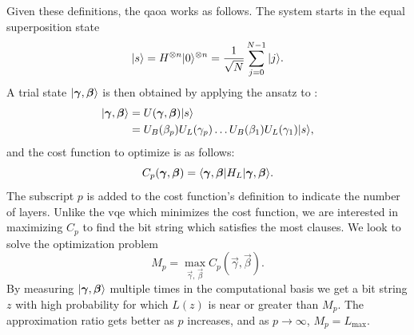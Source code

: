 Given these definitions, the \gls{qaoa} works as follows.
The system starts in the equal superposition state
\begin{equation}
\vert{s}\rangle = H^{\otimes n}\vert{0}\rangle^{\otimes n} = \frac{1}{\sqrt{N}} \sum_{j=0}^{N-1} \vert{j}\rangle.
\end{equation}
A trial state $\vert{\bm{\gamma}, \bm{\beta}}\rangle$ is then obtained by applying the ansatz to :
\begin{align}
\vert{\bm{\gamma}, \bm{\beta}}\rangle &= U(\bm{\gamma}, \bm{\beta})\vert{s}\rangle \\
&= U_B(\beta_p)U_L(\gamma_p) \ldots U_B(\beta_1)U_L(\gamma_1)\vert{s}\rangle,
\end{align}
and the cost function to optimize is as follows:
\begin{equation} 
C_p(\bm{\gamma}, \bm{\beta}) = \langle{\bm{\gamma}, \bm{\beta}}\vert H_L\vert{\bm{\gamma}, \bm{\beta}}\rangle.
\end{equation}
The subscript $p$ is added to the cost function's definition to indicate the number of layers.
Unlike the \gls{vqe} which minimizes the cost function, we are interested in maximizing $C_p$ to find the bit string which satisfies the most clauses.
We look to solve the optimization problem
\begin{equation}
M_p = \max_{\vec{\gamma}, \, \vec{\beta}} C_p(\vec{\gamma}, \vec{\beta}).
\end{equation}
By measuring $\vert{\bm{\gamma}, \bm{\beta}}\rangle$ multiple times in the computational basis we get a bit string $z$ with high probability for which $L(z)$ is near or greater than $M_p$.
The approximation ratio gets better as $p$ increases, and as $p \to \infty$, $M_p = L_{\text{max}}$.
